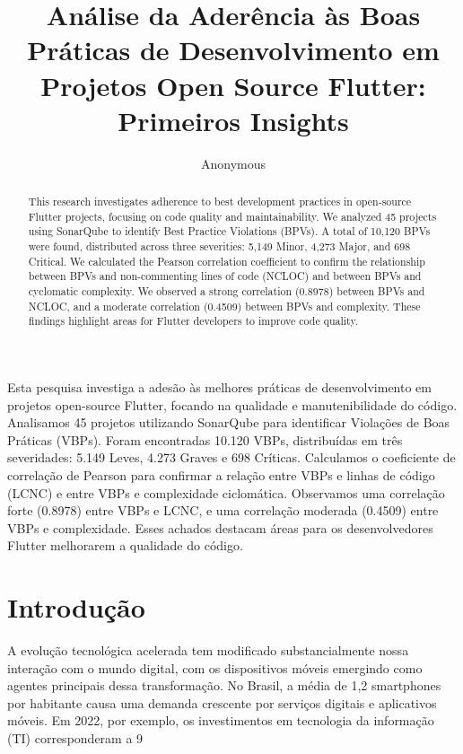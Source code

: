 \documentclass[12pt]{article}
\title{Análise da Aderência às Boas Práticas de Desenvolvimento em Projetos Open Source Flutter: Primeiros Insights}
\author{Anonymous\inst{1}}
\begin{document}
 

\maketitle

\begin{abstract}
This research investigates adherence to best development practices in open-source Flutter projects, focusing on code quality and maintainability. We analyzed 45 projects using SonarQube to identify Best Practice Violations (BPVs). A total of 10,120 BPVs were found, distributed across three severities: 5,149 Minor, 4,273 Major, and 698 Critical. We calculated the Pearson correlation coefficient to confirm the relationship between BPVs and non-commenting lines of code (NCLOC) and between BPVs and cyclomatic complexity. We observed a strong correlation (0.8978) between BPVs and NCLOC, and a moderate correlation (0.4509) between BPVs and complexity. These findings highlight areas for Flutter developers to improve code quality.
\end{abstract}
     
\begin{resumo} 
Esta pesquisa investiga a adesão às melhores práticas de desenvolvimento em projetos open-source Flutter, focando na qualidade e manutenibilidade do código. Analisamos 45 projetos utilizando SonarQube para identificar Violações de Boas Práticas (VBPs). Foram encontradas 10.120 VBPs, distribuídas em três severidades: 5.149 Leves, 4.273 Graves e 698 Críticas. Calculamos o coeficiente de correlação de Pearson para confirmar a relação entre VBPs e linhas de código (LCNC) e entre VBPs e complexidade ciclomática. Observamos uma correlação forte (0.8978) entre VBPs e LCNC, e uma correlação moderada (0.4509) entre VBPs e complexidade. Esses achados destacam áreas para os desenvolvedores Flutter melhorarem a qualidade do código.
\end{resumo}

\section{Introdução}
A evolução tecnológica acelerada tem modificado substancialmente nossa interação com o mundo digital, com os dispositivos móveis emergindo como agentes principais dessa transformação. No Brasil, a média de 1,2 smartphones por habitante causa uma demanda crescente por serviços digitais e aplicativos móveis. Em 2022, por exemplo, os investimentos em tecnologia da informação (TI) corresponderam a 9%
\end{document}
